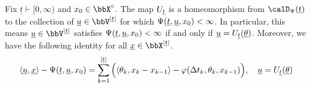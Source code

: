 \begin{theorem}
  \label{theorem:mgf-fdds}
  Fix $\underline t \vdash [0,\infty)$ and $\stateVar_0 \in \stateSpace^\circ$.
  The map $U_{\underline t}$ is a homeomorphism from $\momentSpace(\underline t)$ to the collection of $\underline\momentVar \in \vecSpace^{|\underline t|}$ for which $\Psi(\underline t, \underline{u}, x_0) < \infty$.
  In particular, this means $\underline\momentVar \in \vecSpace^{|\underline t|}$ satisfies $\Psi(\underline t, \underline{u}, x_0) < \infty$ if and only if $\underline{u} = U_{\underline t}(\underline{\theta})$.
  Moreover, we have the following identity for all $\underline\stateVar \in \stateSpace^{|\underline t|}$.
  \begin{equation*}
    {\langle \underline{u}, \underline{x}\rangle} - \Psi(\underline t, \underline{u}, x_0) = \sum_{k=1}^{|\underline t|} \Big( {\langle \theta_k , x_k-x_{k-1} \rangle} - \varphi(\Delta t_k, \theta_k, x_{k-1}) \Big), \quad \underline{u} = U_{\underline t}(\underline{\theta})
  \end{equation*}
\end{theorem}
